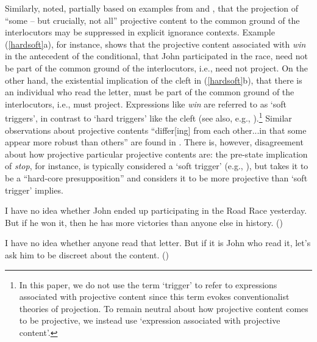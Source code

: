 \documentclass[11pt,fleqn]{article}
\newcommand{\6}{\mbox{$[\hspace*{-.6mm}[$}}
\newcommand{\9}{\mbox{$]\hspace*{-.6mm}]$}}
\def\infelic{{\leavevmode\llap{\#}}}
\begin{document}
Similarly, \citet[432]{simons01} noted, partially based on examples from \citealt{ccmg90} and \citealt{geurts94}, that the projection of ``some -- but crucially, not all'' projective content to the common ground of the interlocutors may be suppressed in explicit ignorance contexts. Example (\ref{hardsoft}a), for instance, shows that the projective content associated with {\em win} in the antecedent of the conditional, that John participated in the race, need not be part of the common ground of the interlocutors, i.e., need not project. On the other hand, the existential implication of the cleft in (\ref{hardsoft}b), that there is an individual who read the letter, must be part of the common ground of the interlocutors, i.e., must project. Expressions like {\em win} are referred to as `soft triggers', in contrast to `hard triggers' like the cleft (see also, e.g., \citealt{abusch10,abrusan2016}).\footnote{In this paper, we do not use the term `trigger' to refer to expressions associated with projective content since this term evokes conventionalist theories of projection. To remain neutral about how projective content comes to be projective, we instead use `expression associated with projective content'.} Similar observations about projective contents ``differ[ing] from each other...in that some appear more robust than others'' are found in \citealt[ch.11]{kadmon01}. There is, however, disagreement about how projective particular projective contents are: the pre-state implication of {\em stop}, for instance, is typically considered a `soft trigger' (e.g., \citealt{simons01,chemla09b,romoli2015}), but \citet[222]{kadmon01} takes it to be a ``hard-core presupposition'' and \citet{abrusan2011,abrusan2016} considers it to be more projective than `soft trigger' implies.

\begin{exe}
\ex\label{hardsoft}
\begin{xlist}

\ex I have no idea whether John ended up participating in the Road Race yesterday. But if he won it, then he has more victories than anyone else in history. \hfill (\citealt[39]{abusch10})

\ex\infelic I have no idea whether anyone read that letter. But if it is John
who read it, let's ask him to be discreet about the content. \hfill (\citealt[40]{abusch10})

\end{xlist}
\end{exe}
\end{document}
